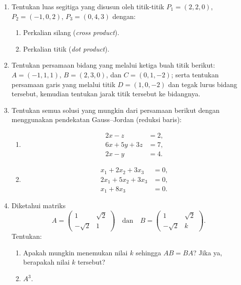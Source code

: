 \documentclass[11pt,a4paper]{article}
\begin{document}
\begin{enumerate}
    \item Tentukan luas segitiga yang disusun oleh titik-titik
    $P_1=(2,2,0)$, $P_2=(-1,0,2)$, $P_3=(0,4,3)$ dengan:
    \begin{enumerate}
        \item Perkalian silang (\textit{cross product}).
        \item Perkalian titik (\textit{dot product}).
    \end{enumerate}

    \item Tentukan persamaan bidang yang melalui ketiga buah titik
    berikut: $A=(-1,1,1)$, $B=(2,3,0)$, dan $C=(0,1,-2)$;
    serta tentukan persamaan garis yang melalui titik $D=(1,0,-2)$
    dan tegak lurus bidang tersebut, kemudian tentukan jarak titik
    tersebut ke bidangnya.

    \item Tentukan semua solusi yang mungkin dari persamaan berikut
    dengan menggunakan pendekatan Gauss--Jordan (reduksi baris):
    \begin{enumerate}
        \item
        \[
        \begin{aligned}
            2x-z&=2,\\
            6x+5y+3z&=7,\\
            2x-y&=4.
        \end{aligned}
        \]
        \item
        \[
        \begin{aligned}
            x_1+2x_2+3x_3&=0,\\
            2x_1+5x_2+3x_3&=0,\\
            x_1+8x_3&=0.
        \end{aligned}
        \]
    \end{enumerate}

    \item Diketahui matriks
    \[
        A=\begin{pmatrix}
            1&\sqrt{2}\\
            -\sqrt{2}&1
        \end{pmatrix}
        \quad\text{dan}\quad
        B=\begin{pmatrix}
            1&\sqrt{2}\\
            -\sqrt{2}&k
        \end{pmatrix}.
    \]
    Tentukan:
    \begin{enumerate}
        \item Apakah mungkin menemukan nilai $k$ sehingga $AB=BA$?
        Jika ya, berapakah nilai $k$ tersebut?
        \item $A^3$.
    \end{enumerate}
\end{enumerate}
\end{document}
